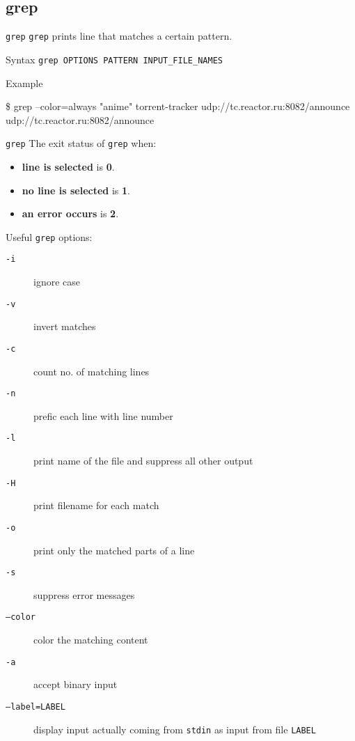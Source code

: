 \documentclass[11pt]{beamer}
\begin{document}
			\subsection{grep}
			\begin{frame}[fragile]{\texttt{grep}}
				\texttt{grep} prints line that matches a certain pattern.
				\begin{alertblock}{Syntax}
					\texttt{grep OPTIONS PATTERN INPUT\_FILE\_NAMES}
				\end{alertblock}
				\begin{exampleblock}{Example}
					\begin{semiverbatim}
\$ grep --color=always "anime" torrent-tracker
udp://tc.{\textbf{\color{red}{anime}}}reactor.ru:8082/announce
udp://tc.{\textbf{\color{red}{anime}}}reactor.ru:8082/announce \end{semiverbatim}	
				\end{exampleblock}
			\end{frame}
			\begin{frame}[t, fragile]{\texttt{grep}}
				The exit status of \texttt{grep} when:
				\begin{itemize}
					\item \textbf{line is selected} is \textbf{0}.
					\item \textbf{no line is selected} is \textbf{1}.
					\item \textbf{an error occurs} is \textbf{2}.
				\end{itemize}
				Useful \texttt{grep} options:
				\begin{description}
					\item[ \texttt{-i}] ignore case
					\item[ \texttt{-v}] invert matches
					\item[ \texttt{-c}] count no. of matching lines
					\item[ \texttt{-n}] prefic each line with line number
					\item[ \texttt{-l}] print name of the file and suppress all other output
					\item[ \texttt{-H}] print filename for each match
					\item[ \texttt{-o}] print only the matched parts of a line
					\item[ \texttt{-s}] suppress error messages
					\item[ \texttt{--color}] color the matching content
					\item[ \texttt{-a} ] accept binary input
					\item[ \texttt{--label=LABEL}] display input actually coming from \texttt{stdin} as input from file \texttt{LABEL}
				\end{description}
			\end{frame}
\end{document}
